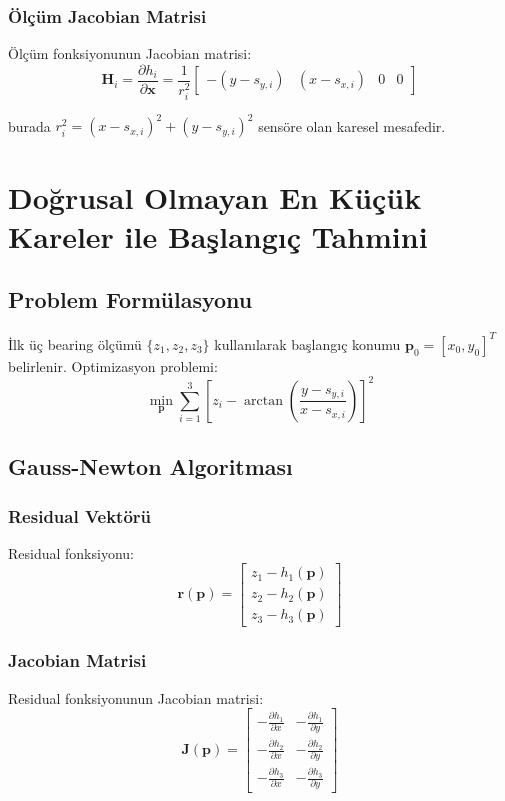 \documentclass[12pt,a4paper]{article}
\begin{document}
\subsubsection{Ölçüm Jacobian Matrisi}
Ölçüm fonksiyonunun Jacobian matrisi:
\begin{equation}
\mathbf{H}_i = \frac{\partial h_i}{\partial \mathbf{x}} = \frac{1}{r_i^2} \begin{bmatrix}
-(y - s_{y,i}) & (x - s_{x,i}) & 0 & 0
\end{bmatrix}
\end{equation}

burada $r_i^2 = (x - s_{x,i})^2 + (y - s_{y,i})^2$ sensöre olan karesel mesafedir.

\section{Doğrusal Olmayan En Küçük Kareler ile Başlangıç Tahmini}

\subsection{Problem Formülasyonu}
İlk üç bearing ölçümü $\{z_1, z_2, z_3\}$ kullanılarak başlangıç konumu $\mathbf{p}_0 = [x_0, y_0]^T$ belirlenir. Optimizasyon problemi:
\begin{equation}
\min_{\mathbf{p}} \sum_{i=1}^{3} \left[ z_i - \arctan\left(\frac{y - s_{y,i}}{x - s_{x,i}}\right) \right]^2
\label{eq:nls_objective}
\end{equation}

\subsection{Gauss-Newton Algoritması}

\subsubsection{Residual Vektörü}
Residual fonksiyonu:
\begin{equation}
\mathbf{r}(\mathbf{p}) = \begin{bmatrix}
z_1 - h_1(\mathbf{p}) \\
z_2 - h_2(\mathbf{p}) \\
z_3 - h_3(\mathbf{p})
\end{bmatrix}
\end{equation}

\subsubsection{Jacobian Matrisi}
Residual fonksiyonunun Jacobian matrisi:
\begin{equation}
\mathbf{J}(\mathbf{p}) = \begin{bmatrix}
-\frac{\partial h_1}{\partial x} & -\frac{\partial h_1}{\partial y} \\
-\frac{\partial h_2}{\partial x} & -\frac{\partial h_2}{\partial y} \\
-\frac{\partial h_3}{\partial x} & -\frac{\partial h_3}{\partial y}
\end{bmatrix}
\end{equation}
\end{document}
